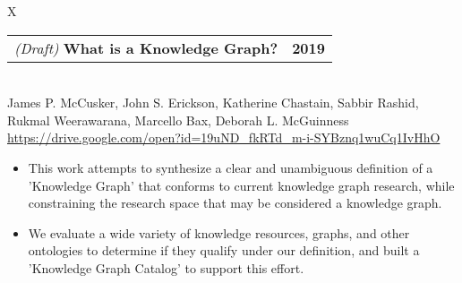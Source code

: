 \documentclass[10pt, letterpaper]{article}
\newcommand{\tabularxwidth}{\textwidth}
\begin{document}
        \begin{minipage}{\tabularxwidth}
        \begin{tabularx}{\tabularxwidth}{X}
            {
                \begin{tabularx}{\tabularxwidth}{@{}X r}
                        \textit{(Draft) }
                    \textbf{What is a Knowledge Graph?} &
                    \textbf{
        2019} \\
                \end{tabularx}
            } \\
            James P. McCusker, John S. Erickson, Katherine Chastain, Sabbir Rashid, Rukmal Weerawarana, Marcello Bax, Deborah L. McGuinness \\

            
            
                \url{https://drive.google.com/open?id=19uND_fkRTd_m-i-SYBznq1wuCq1IvHhO} \\
            
            
        \end{tabularx}

        \begin{itemize}[noitemsep, topsep=3pt, parsep=0pt, partopsep=0pt]
            
                \item 
    This work attempts to synthesize a clear and unambiguous definition of a 'Knowledge Graph' that conforms to current knowledge graph research, while constraining the research space that may be considered a knowledge graph.
            
                \item 
    We evaluate a wide variety of knowledge resources, graphs, and other ontologies to determine if they qualify under our definition, and built a 'Knowledge Graph Catalog' to support this effort.
            
        \end{itemize}

        
            \vspace{.5em}
        

        \end{minipage}
    
\end{document}
